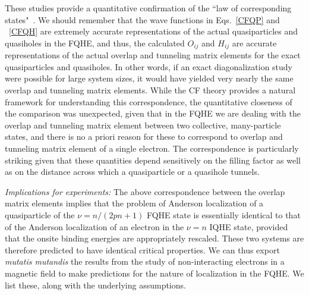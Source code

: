 \documentclass[twocolumn,floatfix,prb,aps,showpacs]{revtex4-2}
\begin{document}
These studies provide a quantitative confirmation of the ``law of corresponding states"~\cite{Jain90b,Kivelson92}. We should remember that the wave functions in Eqs.~\ref{CFQP} and ~\ref{CFQH} are extremely accurate representations of the actual quasiparticles and quasiholes in the FQHE, and thus, the calculated $O_{ij}$ and $H_{ij}$ are accurate representations of the actual overlap and tunneling matrix elements for the exact quasiparticles and quasiholes. In other words, if an exact diagonalization study were possible for large system sizes, it would have yielded very nearly the same overlap and tunneling matrix elements.  While the CF theory provides a natural framework for understanding this correspondence, the quantitative closeness of the comparison was unexpected, given that in the FQHE we are dealing with the overlap and tunneling matrix element between two collective, many-particle states, and there is no a priori reason for these to correspond to overlap and tunneling matrix element of a single electron. The correspondence is particularly striking given that these quantities depend sensitively on the filling factor as well as on the distance across which a quasiparticle or a quasihole tunnels. 


{\it Implications for experiments:}  
The above correspondence between the overlap matrix elements implies that the problem of Anderson localization of a quasiparticle of the $\nu=n/(2pn+1)$ FQHE state is essentially identical to that of the Anderson localization of an electron in the $\nu=n$ IQHE state,  provided that the onsite binding energies are appropriately rescaled. These two systems are therefore predicted to have identical critical properties. We can thus export {\it mutatis mutandis} the results from the study of non-interacting electrons in a magnetic field to make predictions for the nature of localization in the FQHE. We list these, along with the underlying assumptions.
\end{document}
